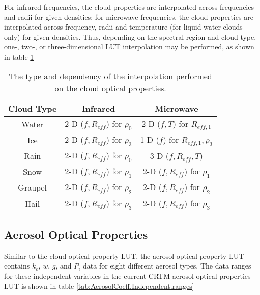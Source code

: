 For infrared frequencies, the cloud properties are interpolated across frequencies and radii for given densities; for microwave frequencies, the cloud properties are interpolated across frequency, radii and temperature (for liquid water clouds only) for given densities. Thus, depending on the spectral region and cloud type, one-, two-, or three-dimensional LUT interpolation may be performed, as shown in table \ref{tab:cloud_opt_interp}

\begin{table}[htp]
  \centering
  \begin{tabular}{|c | c | c|}
    \hline
    \textbf{Cloud Type} & \textbf{Infrared} & \textbf{Microwave} \\
    \hline\hline
    Water      & 2-D ($f,R_{eff}$) for $\rho_{0}$ & 2-D ($f,T$) for $R_{eff,1}$ \\
    Ice        & 2-D ($f,R_{eff}$) for $\rho_{3}$ & 1-D ($f$) for $R_{eff,1},\rho_{3}$\\
    Rain       & 2-D ($f,R_{eff}$) for $\rho_{0}$ & 3-D ($f,R_{eff},T$) \\
    Snow       & 2-D ($f,R_{eff}$) for $\rho_{1}$ & 2-D ($f,R_{eff}$) for $\rho_{1}$ \\
    Graupel    & 2-D ($f,R_{eff}$) for $\rho_{2}$ & 2-D ($f,R_{eff}$) for $\rho_{2}$ \\
    Hail       & 2-D ($f,R_{eff}$) for $\rho_{3}$ & 2-D ($f,R_{eff}$) for $\rho_{3}$ \\
    \hline
  \end{tabular}
  \caption{The type and dependency of the interpolation performed on the cloud optical properties.}
  \label{tab:cloud_opt_interp}
\end{table}


\subsection{Aerosol Optical Properties}
Similar to the cloud optical property LUT, the aerosol optical property LUT contains $k_{e}$, $w$, $g$, and $P_{i}$ data for eight different aerosol types. The data ranges for these independent variables in the current CRTM aerosol optical properties LUT is shown in table \ref{tab:AerosolCoeff.Independent.ranges}

